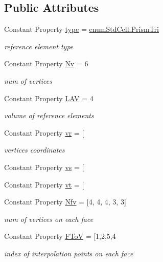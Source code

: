 \subsection*{Public Attributes}
\begin{DoxyCompactItemize}
\item 
Constant Property \hyperlink{class_std_prism_tri_a51803876c1f6f01469a4b5820fac5553}{type} = \hyperlink{classenum_std_cell_ac4c2fa4e189e76e103f3ff9b1d19b9e7a50e59d01719761402ae7fe95c54b1360}{enum\+Std\+Cell.\+Prism\+Tri}
\begin{DoxyCompactList}\small\item\em reference element type \end{DoxyCompactList}\item 
Constant Property \hyperlink{class_std_prism_tri_ae8726861a4238aa232cf25ddb40e318c}{Nv} = 6
\begin{DoxyCompactList}\small\item\em num of vertices \end{DoxyCompactList}\item 
Constant Property \hyperlink{class_std_prism_tri_a589701d6be2784f667b7608d32205a6e}{L\+AV} = 4
\begin{DoxyCompactList}\small\item\em volume of reference elements \end{DoxyCompactList}\item 
Constant Property \hyperlink{class_std_prism_tri_a87d7bf3e382d8683bb7a75b79acc9d4b}{vr} = \mbox{[}
\begin{DoxyCompactList}\small\item\em vertices coordinates \end{DoxyCompactList}\item 
Constant Property \hyperlink{class_std_prism_tri_aa4659d9663148da529fc50b5058c03f1}{vs} = \mbox{[}
\item 
Constant Property \hyperlink{class_std_prism_tri_a505548c307095d9254e96b82400346b8}{vt} = \mbox{[}
\item 
Constant Property \hyperlink{class_std_prism_tri_a3cfc1041c891dcfd731940749d25f055}{Nfv} = \mbox{[}4, 4, 4, 3, 3\mbox{]}
\begin{DoxyCompactList}\small\item\em num of vertices on each face \end{DoxyCompactList}\item 
Constant Property \hyperlink{class_std_prism_tri_ae5f4fe1b8473e8313acad8f0bf9adcd5}{F\+ToV} = \mbox{[}1,2,5,4
\begin{DoxyCompactList}\small\item\em index of interpolation points on each face \end{DoxyCompactList}\item 

\end{DoxyCompactItemize}
